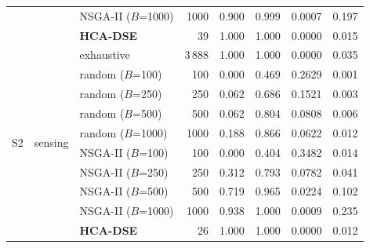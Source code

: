 \documentclass[pdflatex,sn-nature]{sn-jnl}
\theoremstyle{thmstyleone}
\theoremstyle{thmstyletwo}
\theoremstyle{thmstylethree}
\begin{document}
\begin{table}[!htbp]
{\begin{tabular}{lllrrrrr}
 & & NSGA-II ($B$=1000) & 1000 & 0.900 & 0.999 & 0.0007 & 0.197 \\
 & & \textbf{HCA-DSE} & 39 & 1.000 & 1.000 & 0.0000 & 0.015 \\
\midrule
\multirow{10}{*}{S2} & \multirow{10}{*}{sensing} & exhaustive & 3\,888 & 1.000 & 1.000 & 0.0000 & 0.035 \\
 & & random ($B$=100) & 100 & 0.000 & 0.469 & 0.2629 & 0.001 \\
 & & random ($B$=250) & 250 & 0.062 & 0.686 & 0.1521 & 0.003 \\
 & & random ($B$=500) & 500 & 0.062 & 0.804 & 0.0808 & 0.006 \\
 & & random ($B$=1000) & 1000 & 0.188 & 0.866 & 0.0622 & 0.012 \\
 & & NSGA-II ($B$=100) & 100 & 0.000 & 0.404 & 0.3482 & 0.014 \\
 & & NSGA-II ($B$=250) & 250 & 0.312 & 0.793 & 0.0782 & 0.041 \\
 & & NSGA-II ($B$=500) & 500 & 0.719 & 0.965 & 0.0224 & 0.102 \\
 & & NSGA-II ($B$=1000) & 1000 & 0.938 & 1.000 & 0.0009 & 0.235 \\
 & & \textbf{HCA-DSE} & 26 & 1.000 & 1.000 & 0.0000 & 0.012 \\
\midrule
\bottomrule
\end{tabular}}
\end{table}
\end{document}

